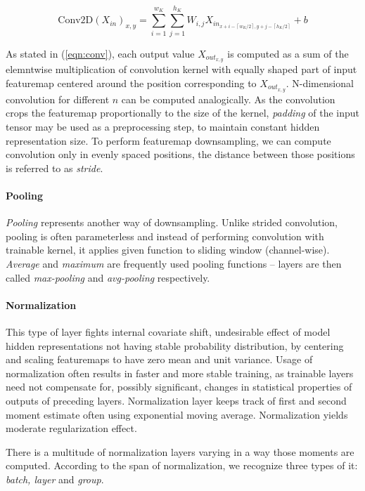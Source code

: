 \begin{equation} \label{eqn:conv}
\text{Conv2D}(X_{in})_{x, y} =
    \sum\limits_{i=1}^{w_K}
    \sum\limits_{j=1}^{h_K}
    W_{i,j} X_{in_{x + i - \left\lceil w_K / 2 \right\rceil, y + j - \left\lceil h_K / 2 \right\rceil}} + b
\end{equation}

\indent As stated in (\ref{eqn:conv}), each output value $X_{out_{x, y}}$ is computed as a sum of the elemntwise multiplication of convolution kernel with equally shaped part of input featuremap centered around the position corresponding to $X_{out_{x, y}}$. N-dimensional convolution for different $n$ can be computed analogically. As the convolution crops the featuremap proportionally to the size of the kernel, \emph{padding} of the input tensor may be used as a preprocessing step, to maintain constant hidden representation size. To perform featuremap downsampling, we can compute convolution only in evenly spaced positions, the distance between those positions is referred to as \emph{stride}.

\paragraph{Pooling}
\emph{Pooling} represents another way of downsampling. Unlike strided convolution, pooling is often parameterless and instead of performing convolution with trainable kernel, it applies given function to sliding window (channel-wise). \emph{Average} and \emph{maximum} are frequently used pooling functions -- layers are then called \emph{max-pooling} and \emph{avg-pooling} respectively.

\paragraph{Normalization}
This type of layer fights internal covariate shift, undesirable effect of model hidden representations not having stable probability distribution, by centering and scaling featuremaps to have zero mean and unit variance. Usage of normalization often results in faster and more stable training, as trainable layers need not compensate for, possibly significant, changes in statistical properties of outputs of preceding layers. Normalization layer keeps track of first and second moment estimate often using exponential moving average. Normalization yields moderate regularization effect.

There is a multitude of normalization layers varying in a way those moments are computed. According to the span of normalization, we recognize three types of it: \emph{batch, layer} and \emph{group}.

